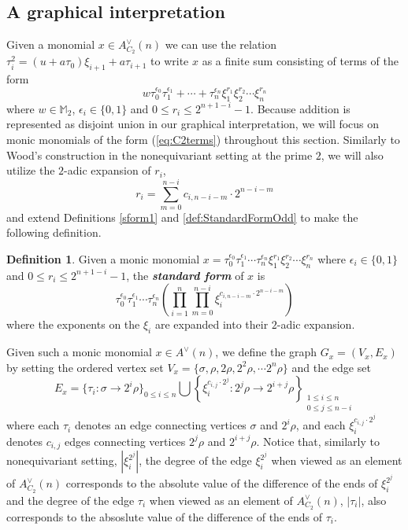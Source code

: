 \documentclass{amsart}
\theoremstyle{definition}
\newtheorem{deff}[theorem]{Definition}
\theoremstyle{plain}
\numberwithin{theorem}{section}
\numberwithin{equation}{section}
\numberwithin{figure}{section}
\newcommand{\mM}{{\mathbb M}}
\newcommand{\0}{\langle 0 \rangle }
\begin{document}
\subsection{A graphical interpretation} Given a monomial $x \in A_{C_2}^\vee (n)$ we can use the relation $\tau_i^2=(u+a\tau_0)\xi_{i+1}+a\tau_{i+1}$ to write $x$ as a finite sum consisting of terms of the form
\begin{equation} \label{eq:C2terms}
w \tau_0^{\epsilon_0} \tau_1^{\epsilon_1} + \cdots + \tau_n^{\epsilon_n} \xi_1^{r_1} \xi_2^{r_2} \cdots \xi_n^{{ r_n}}
\end{equation}
where $w \in \mM_2$, $\epsilon_i \in \{0,1\}$ and $0 \leq r_i \leq 2^{n + 1 - i} - 1$. Because addition is represented as disjoint union in our graphical interpretation, we will focus on monic monomials of the form (\ref{eq:C2terms}) throughout this section. Similarly to Wood's construction in the nonequivariant setting at the prime $2$, we will also utilize the $2$-adic expansion of $r_i$,
\[
r_i = \sum_{m  = 0}^{n - i} c_{i, n - i-m} \cdot 2^{n - i - m}
\]
and extend Definitions \ref{sform1} and \ref{def:StandardFormOdd} to make the following definition.
\begin{deff} \label{def:StandardFormEquivariant}
    Given a monic monomial $x =\tau_0^{\epsilon_0} \tau_1^{\epsilon_1} \cdots  \tau_n^{\epsilon_n} \xi_1^{r_1} \xi_2^{r_2} \cdots \xi_n^{{ r_n}}$ where $\epsilon_i \in \{0,1\}$ and $0 \leq r_i \leq 2^{n + 1 - i} - 1$, the {\bf \textit{standard form}} of $x$ is 
    \[
     \tau_0^{\epsilon_0} \tau_1^{\epsilon_1} \cdots \tau_n^{\epsilon_n} \left(\prod_{i = 1}^n \prod_{m = 0}^{n - i} \xi_i^{c_{i, n - i -m} \cdot 2^{n - i - m}} \right)
    \]
    where the exponents on the $\xi_i$ are { expanded into} their $2$-adic expansion. 
\end{deff}

Given such a monic monomial $x \in A^\vee (n)$, we define the graph $G_x = (V_x, E_x) $ by setting the ordered vertex set $V_x = \{\sigma, \rho, 2 \rho, 2^2 \rho, \cdots 2^n \rho\}$ and the edge set
\[
E_x = \{\tau_i: \sigma \to 2^i \rho \}_{0 \leq i \leq n} \bigcup \left\{ \xi_i^{c_{i,j} \cdot 2^j} : 2^j \rho \to 2^{ i + j} \rho \right\}_{\substack{1 \leq i \leq n \\ 0 \leq j \leq n - i}}
\]
where each $\tau_i$ denotes an edge connecting vertices $\sigma$ and $2^i \rho$, and each $\xi_i^{c_{i,j} \cdot 2^j}$ denotes $c_{i,j}$ edges connecting vertices $2^j \rho$ and $2^{i + j} \rho$. Notice that, similarly to nonequivariant setting, $| \xi_i^{2^j} |$, the degree of the edge $\xi_i^{2^j}$ { when viewed as an element of $A^\vee_{C_2}(n)$} corresponds to the absolute value of the difference of the ends of $\xi_i^{2^j}$ and the degree of the edge $\tau_i$ { when viewed as an element of $A^\vee_{C_2}(n)$}, $| \tau_i |$, also corresponds to the absoslute value of the difference of the ends of $\tau_i$.  
\end{document}
